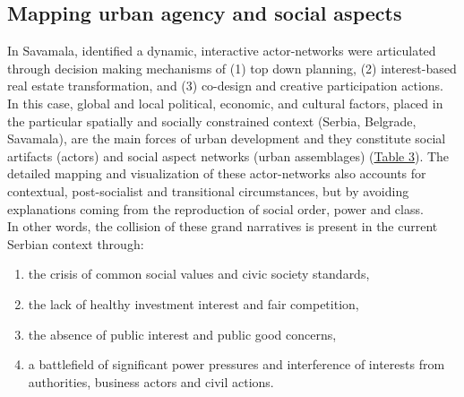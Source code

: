 \documentclass[11pt]{report}
\begin{document}
\subsection{Mapping urban agency and social aspects}

In Savamala, identified a dynamic, interactive actor-networks were articulated through decision making mechanisms of
(1) top down planning,
(2) interest-based real estate transformation,
and
(3) co-design and creative participation actions.
In this case, global and local political, economic, and cultural factors, placed in the particular spatially and socially constrained context (Serbia, Belgrade, Savamala), are the main forces of urban development and they constitute social artifacts (actors) and social aspect networks (urban assemblages) (\href{}{Table 3}).
The detailed mapping and visualization of these actor-networks also accounts for contextual, post-socialist and transitional circumstances, but by avoiding explanations coming from the reproduction of social order, power and class.
\\

In other words, the collision of these grand narratives is present in the current Serbian context through:
\begin{enumerate}
\item  the crisis of common social values and civic society standards, 
\item the lack of healthy investment interest and fair competition, 
\item the absence of public interest and public good concerns, 
\item a battlefield of significant power pressures and interference of interests from authorities, business actors and civil actions.
\end{enumerate}
\end{document}
